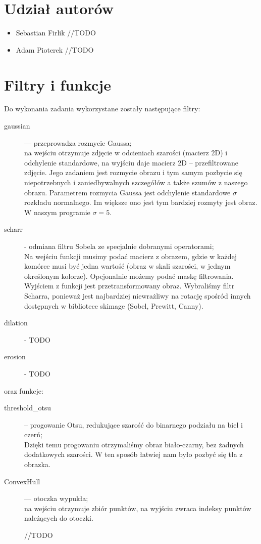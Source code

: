 \documentclass{article}
\begin{document}


\section*{Udział autorów}
\begin{itemize}
\item Sebastian Firlik //TODO
\item Adam Pioterek //TODO
\end{itemize}

\section{Filtry i funkcje}
Do wykonania zadania wykorzystane zostały następujące filtry:
\begin{description}
\item[gaussian] — przeprowadza rozmycie Gaussa;\\
na wejściu otrzymuje zdjęcie w odcieniach szarości (macierz 2D) i odchylenie standardowe, na wyjściu daje macierz 2D – przefiltrowane zdjęcie.
Jego zadaniem jest rozmycie obrazu i tym samym pozbycie się niepotrzebnych i zaniedbywalnych szczegółów  a także szumów z naszego obrazu. Parametrem rozmycia Gaussa jest odchylenie standardowe $\sigma$ rozkładu normalnego. Im większe ono jest tym bardziej rozmyty jest obraz. W naszym programie $\sigma = 5$. 
\item[scharr] - odmiana filtru Sobela ze specjalnie dobranymi operatorami;\\
Na wejściu funkcji musimy podać macierz z obrazem, gdzie w każdej komórce musi być jedna wartość (obraz w skali szarości, w jednym określonym kolorze). Opcjonalnie możemy podać maskę filtrowania. Wyjściem z funkcji jest przetransformowany obraz. Wybraliśmy filtr Scharra, ponieważ jest najbardziej niewrażliwy na rotację spośród innych dostępnych w bibliotece skimage (Sobel, Prewitt, Canny).
\item[dilation] - TODO
\item[erosion] - TODO
\end{description}
oraz funkcje:
\begin{description}
\item[threshold\_otsu] -- progowanie Otsu, redukujące szarość do binarnego podziału na biel i czerń;\\
Dzięki temu progowaniu otrzymaliśmy obraz biało-czarny, bez żadnych dodatkowych szarości. W ten sposób łatwiej nam było pozbyć się tła z obrazka.
\item[ConvexHull] — otoczka wypukła;\\
na wejściu otrzymuje zbiór punktów, na wyjściu zwraca indeksy punktów należących do otoczki.

//TODO
\end{description}
 
\end{document}
